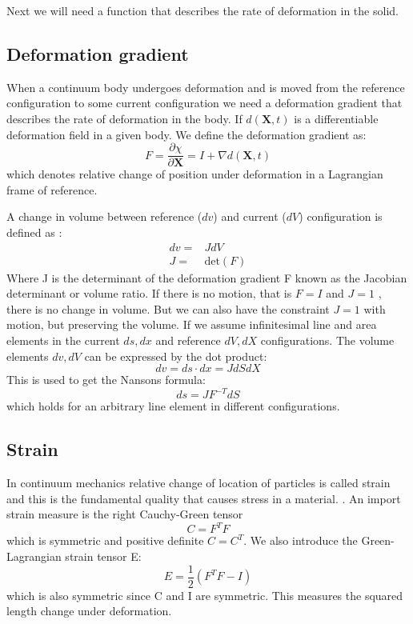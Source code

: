 Next we will need a function that describes the rate of deformation in the solid.
\subsection{Deformation gradient}
When a continuum body undergoes deformation and is moved from the reference configuration to some current configuration we need a deformation gradient that describes the rate of deformation in the body. 
If $d(\textbf{X},t)$ is a differentiable deformation field in a given body. We define the deformation gradient as:  
\begin{equation}
\label{eq:deformation_gradient}
F = \frac{\partial \chi}{\partial \textbf{X}} = I + \nabla d(\textbf{X},t) 
\end{equation}
which denotes relative change of position under deformation in a Lagrangian frame of reference.  

A change in volume between reference ($dv$) and current ($dV$) configuration is defined as :
\begin{align}
\label{eq:det_F}
dv =& J dV\\
J =& \text{det}(F)
\end{align}
Where J is the determinant of the deformation gradient F known as the Jacobian determinant or volume ratio. If there is no motion, that is $ F = I$ and $J=1$ , there is no change in volume. But we can also have the constraint $J=1$ with motion, but preserving the volume.
If we assume infinitesimal line and area elements in the current $ds, dx$ and reference $dV,dX$ configurations. The volume elements $dv, dV$ can be expressed by the dot product:
\begin{equation}
 dv = ds\cdot dx = J dS dX
\end{equation}
This is used to get the Nansons formula:
\begin{equation}\label{eq:Nanson}
ds = JF^{-T}dS
\end{equation}
which holds for an arbitrary line element in different configurations.

\subsection{Strain}
In continuum mechanics relative change of location of particles is called strain and this is the fundamental quality that causes stress in a material. \cite{Richter2016}. An import strain measure is the right Cauchy-Green tensor 
$$C = F^TF$$ 
which is symmetric and positive definite $C = C^T$.  We also introduce the Green-Lagrangian strain tensor E:
\begin{equation}\label{eq:StrainTensor}
E = \frac{1}{2}(F^TF -I) 
\end{equation}
which is also symmetric since C and I are symmetric. This measures the squared length change under deformation.
		
